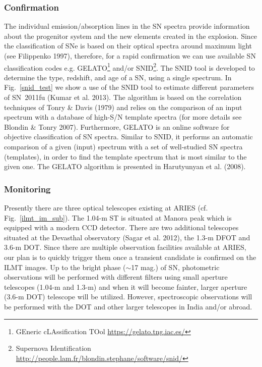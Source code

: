\documentclass[12pt,a4paper]{article}
\begin{document}

\subsubsection{Confirmation}

The individual emission/absorption lines in the SN spectra provide information about the progenitor 
system and the new elements created in the explosion. Since the classification of SNe is based on 
their optical spectra around maximum light (see Filippenko 1997), therefore, for a rapid confirmation
we can use available SN classification codes e.g. GELATO\footnote{GEneric cLAssification TOol 
\url{https://gelato.tng.iac.es/}} and/or
SNID\footnote{Supernova Identification \url{http://people.lam.fr/blondin.stephane/software/snid/}}.
The SNID tool is developed to determine the type, redshift, and age of a SN, using a single spectrum. 
In Fig.~\ref{snid_test} we show a use of the SNID tool to estimate different parameters of SN~2011fu
(Kumar et al. 2013).
The algorithm is based on the correlation techniques of Tonry \& Davis (1979) and relies on the 
comparison of an input spectrum with a database of high-S/N template spectra (for more details see 
Blondin \& Tonry 2007). 
Furthermore, GELATO is an online software for objective classification of SN spectra. Similar to SNID, 
it performs an automatic comparison of a given (input) spectrum with a set of well-studied SN spectra 
(templates), in order to find the template spectrum that is most similar to the given one. The GELATO 
algorithm is presented in Harutyunyan et al. (2008).

\subsubsection{Monitoring}

Presently there are three optical telescopes existing at ARIES (cf. Fig.~\ref{ilmt_im_sub}).
The 1.04-m ST is situated at Manora peak which is equipped with a modern CCD detector. 
There are two additional telescopes situated at the Devasthal observatory (Sagar et al. 2012), 
the 1.3-m DFOT and 3.6-m DOT. 
Since there are multiple observation facilities available at ARIES, our plan is to quickly 
trigger them once a transient candidate  is confirmed on the ILMT images.
Up to the bright phase ($\sim$17 mag.) of SN, photometric observations will be
performed with different filters using small aperture telescopes (1.04-m and 1.3-m)
and when it will become fainter, larger aperture (3.6-m DOT) telescope will be utilized.
However, spectroscopic observations will be performed with the DOT and other larger 
telescopes in India and/or abroad.
%
\end{document}

